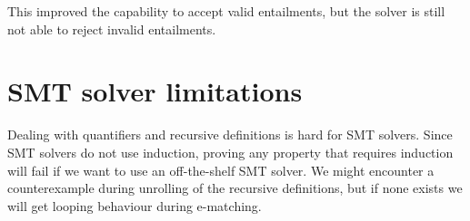 \documentclass[a4paper]{article}
\begin{document}

This improved the capability to accept valid entailments,
but the solver is still not able to reject invalid entailments.


\section{SMT solver limitations}
\label{sec:smt-limitations}
Dealing with quantifiers and recursive definitions is hard for SMT solvers.
Since SMT solvers do not use induction, proving any property that requires induction
will fail if we want to use an off-the-shelf SMT solver.
We might encounter a counterexample during unrolling of the recursive definitions,
but if none exists we will get looping behaviour during e-matching.
\end{document}
